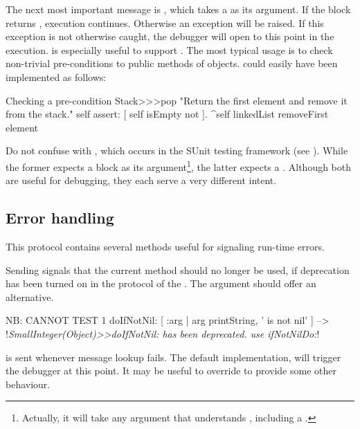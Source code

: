 \documentclass[a4paper,10pt,twoside]{book}
\begin{document}

The next most important message is , which takes a  as its argument. If the block returns , execution continues. Otherwise an  exception will be raised. If this exception is not otherwise caught, the debugger will open to this point in the execution.  is especially useful to support . The most typical usage is to check non-trivial pre-conditions to public methods of objects.  could easily have been implemented as follows:

\begin{method}{Checking a pre-condition}
Stack>>>pop
    "Return the first element and remove it from the stack."
    self assert: [ self isEmpty not ].
    ^self linkedList removeFirst element
\end{method}

Do not confuse  with , which occurs in the SUnit testing framework (see ). While the former expects a block as its argument\footnote{Actually, it will take any argument that understands , including a .}, the latter expects a . Although both are useful for debugging, they each serve a very different intent.

\subsection{Error handling}

This protocol contains several methods useful for signaling run-time errors.

Sending  signals that the current method should no longer be used, if deprecation has been turned on in the  protocol of the .
The  argument should offer an alternative.

\begin{code}{NB: CANNOT TEST}
1 doIfNotNil: [ :arg | arg printString, ' is not nil' ]
	--> !\emph{SmallInteger(Object)>>doIfNotNil: has been deprecated. use ifNotNilDo:}!
\end{code}

 is sent whenever message lookup fails. The default implementation, \ie {} will trigger the debugger at this point. It may be useful to override  to provide some other behaviour.
\end{document}

